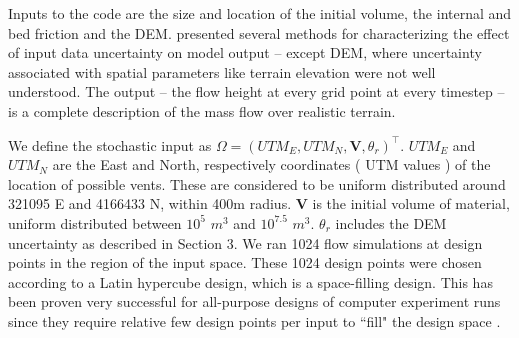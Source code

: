 \documentclass[12pt,letterpaper]{article}
\begin{document}
Inputs to the code are the size and location of the initial volume,
the internal and bed friction and the DEM. \citet{Keith} presented
several methods for characterizing the effect of input data
uncertainty on model output -- except DEM, where uncertainty associated 
with spatial parameters like terrain elevation were not well understood.
The output -- the flow height at every grid point
at every timestep -- is a complete description of the mass flow over realistic terrain.

We define the stochastic input as $\Omega = (UTM_E, UTM_N, \textbf{V}, \theta_r)^\top$. 
$UTM_E$ and $UTM_N$ are the East and North, respectively coordinates ( UTM values )
of the location of possible vents. These are considered to be uniform distributed around 
321095 E and 4166433 N, within 400m radius. \textbf{V} is the initial volume of material,
uniform distributed between $10^{5}$ $m^3$ and $10^{7.5}$ $m^3$. $\theta_r$ includes the DEM uncertainty as described 
in Section 3. We ran 1024 flow simulations at design points in the region of the input space. These 1024
design points were chosen according to a Latin hypercube design, which is a space-filling 
design. This has been proven very successful for all-purpose designs of computer experiment runs
since they require relative few design points per input to ``fill" the design space \citep{Sacks1989}. 
\end{document}
